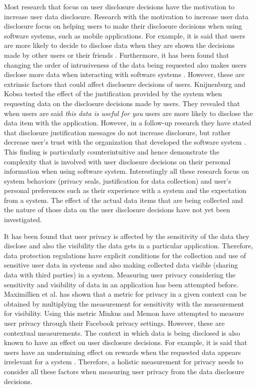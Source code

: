 \documentclass[conference]{IEEEtran}
\begin{document}
Most research that focus on user disclosure decisions have the motivation to increase user data disclosure. Research with the motivation to increase user data disclosure focus on helping users to make their disclosure decisions when using software systems, such as mobile applications. For example, it is said that users are more likely to decide to disclose data when they are shown the decisions made by other users \cite {besmer2010impact} or their friends \cite {dennett2000little}. Furthermore, it has been found that changing the order of intrusiveness of the data being requested also makes users disclose more data when interacting with software systems \cite {acquisti2012impact}. However, these are extrinsic factors that could affect disclosure decisions of users. Knijnenburg and Kobsa \cite {knijnenburg2013helping} tested the effect of the justification provided by the system when requesting data on the disclosure decisions made by users. They revealed that when users are said \textit{this data is useful for you} users are more likely to disclose the data item with the application. However, in a follow-up research they have stated that disclosure justification messages do not increase disclosure, but rather decrease user's trust with the organization that developed the software system \cite {knijnenburg2013making}. This finding is particularly counterintuitive and hence demonstrate the complexity that is involved with user disclosure decisions on their personal information when using software system. Interestingly all these research focus on system behaviors (privacy seals, justification for data collection) and user's personal preferences such as their experience with a system and the expectation from a system. The effect of the actual data items that are being collected and the nature of those data on the user disclosure decisions have not yet been investigated.

It has been found that user privacy is affected by the sensitivity of the data they disclose and also the visibility the data gets in a particular application. Therefore, data protection regulations have explicit conditions for the collection and use of sensitive user data in systems and also making collected data visible (sharing data with third parties) in a system. Measuring user privacy considering the sensitivity and visibility of data in an application has been attempted before. Maximillien et al. has shown that a metric for privacy in a given context can be obtained by multiplying the measurement for sensitivity with the measurement for visibility. Using this metric Minkus and Memon \cite{minkus2014scale} have attempted to measure user privacy through their Facebook privacy settings. However, these are contextual measurements. The context in which data is being disclosed \cite {nissenbaum2009privacy, john2010strangers} is also known to have an effect on user disclosure decisions. For example, it is said that users have an undermining effect on rewards when the requested data appears irrelevant for a system \cite {li2010understanding}. Therefore, a holistic measurement for privacy needs to consider all these factors when measuring user privacy from the data disclosure decisions. 
\end{document}
